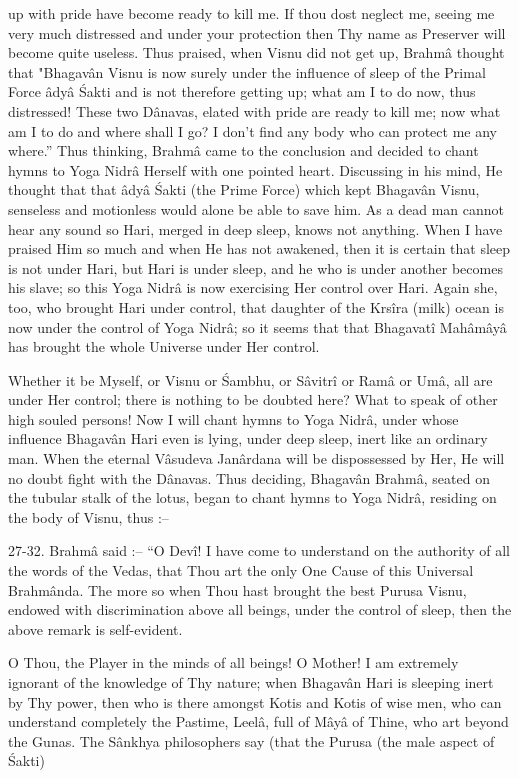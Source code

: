 up with pride have become ready to kill me. If thou dost neglect me, seeing me very much distressed and under your protection then Thy name as Preserver will become quite useless. Thus praised, when Visnu did not get up, Brahm\^a thought that "Bhagav\^an Visnu is now surely under the influence of sleep of the Primal Force \^ady\^a \'Sakti and is not therefore getting up; what am I to do now, thus distressed! These two D\^anavas, elated with pride are ready to kill me; now what am I to do and where shall I go? I don't find any body who can protect me any where.'' Thus thinking, Brahm\^a came to the conclusion and decided to chant hymns to Yoga Nidr\^a Herself with one pointed heart. Discussing in his mind, He thought that that \^ady\^a \'Sakti (the Prime Force) which kept Bhagav\^an Visnu, senseless and motionless would alone be able to save him. As a dead man cannot hear any sound so Hari, merged in deep sleep, knows not anything. When I have praised Him so much and when He has not awakened, then it is certain that sleep is not under Hari, but Hari is under sleep, and he who is under another becomes his slave; so this Yoga Nidr\^a is now exercising Her control over Hari. Again she, too, who brought Hari under control, that daughter of the Krs\^ira (milk) ocean is now under the control of Yoga Nidr\^a; so it seems that that Bhagavat\^i Mah\^am\^ay\^a has brought the whole Universe under Her control.

Whether it be Myself, or Visnu or \'Sambhu, or S\^avitr\^i or Ram\^a or Um\^a, all are under Her control; there is nothing to be doubted here? What to speak of other high souled persons! Now I will chant hymns to Yoga Nidr\^a, under whose influence Bhagav\^an Hari even is lying, under deep sleep, inert like an ordinary man. When the eternal V\^asudeva Jan\^ardana will be dispossessed by Her, He will no doubt fight with the D\^anavas. Thus deciding, Bhagav\^an Brahm\^a, seated on the tubular stalk of the lotus, began to chant hymns to Yoga Nidr\^a, residing on the body of Visnu, thus :--

27-32. Brahm\^a said :-- ``O Dev\^i! I have come to understand on the authority of all the words of the Vedas, that Thou art the only One Cause of this Universal Brahm\^anda. The more so when Thou hast brought the best Purusa Visnu, endowed with discrimination above all beings, under the control of sleep, then the above remark is self-evident.

O Thou, the Player in the minds of all beings! O Mother! I am extremely ignorant of the knowledge of Thy nature; when Bhagav\^an Hari is sleeping inert by Thy power, then who is there amongst Kotis and Kotis of wise men, who can understand completely the Pastime, Leel\^a, full of M\^ay\^a of Thine, who art beyond the Gunas. The S\^ankhya philosophers say (that the Purusa (the male aspect of \'Sakti)

